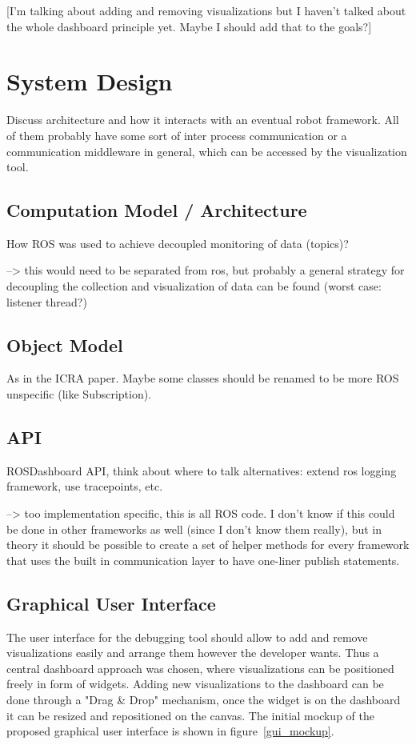 [I'm talking about adding and removing visualizations but I haven't talked about the whole dashboard principle yet. Maybe I should add that to the goals?]

\section{System Design}
Discuss architecture and how it interacts with an eventual robot framework. All of them probably have some sort of inter process communication or a communication middleware in general, which can be accessed by the visualization tool.

\subsection{Computation Model / Architecture}
How ROS was used to achieve decoupled monitoring of data (topics)?

--> this would need to be separated from ros, but probably a general strategy for decoupling the collection and visualization of data can be found (worst case: listener thread?)

\subsection{Object Model}
As in the ICRA paper. Maybe some classes should be renamed to be more ROS unspecific (like Subscription).

\subsection{API}
ROSDashboard API, think about where to talk alternatives: extend ros logging framework, use tracepoints, etc.

--> too implementation specific, this is all ROS code. I don't know if this could be done in other frameworks as well (since I don't know them really), but in theory it should be possible to create a set of helper methods for every framework that uses the built in communication layer to have one-liner publish statements.

\subsection{Graphical User Interface}
The user interface for the debugging tool should allow to add and remove visualizations easily and arrange them however the developer wants. Thus a central dashboard approach was chosen, where visualizations can be positioned freely in form of widgets. Adding new visualizations to the dashboard can be done through a "Drag \& Drop" mechanism, once the widget is on the dashboard it can be resized and repositioned on the canvas. The initial mockup of the proposed graphical user interface is shown in figure~\ref{gui_mockup}.

